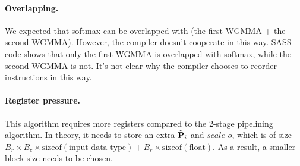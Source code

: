 \paragraph{Overlapping.} 
We expected that softmax can be overlapped with (the first WGMMA + the second WGMMA). However, the compiler doesn't cooperate in this way.
SASS code shows that only the first WGMMA is overlapped with softmax, while the second WGMMA is not. It's not clear why the compiler chooses to reorder instructions in this way.

\paragraph{Register pressure.}
This algorithm requires more registers compared to the 2-stage pipelining algorithm. 
In theory, it needs to store an extra $\tilde{\mathbf{P}}_{i}$ and $scale\_o$, which is of size $B_r \times B_c \times \text{sizeof}(\text{input\_data\_type}) + B_r \times \text{sizeof}(\text{float})$.
As a result, a smaller block size needs to be chosen.













